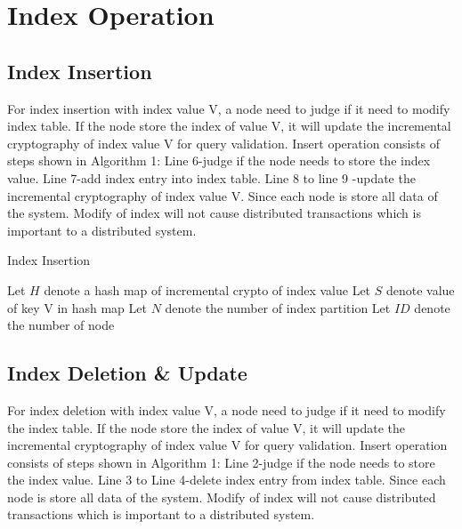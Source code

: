 
\section{Index Operation}
\subsection{Index Insertion}
\vspace{-0.2cm}
For index insertion with index value V, a node need to judge if it need to modify index table. If the node store the
index of value V, it will update the incremental cryptography of index value V for query validation. Insert operation
consists of steps shown in Algorithm 1: Line 6-judge if the node needs to store the index value. Line 7-add index entry
into index table. Line 8 to line 9 -update the incremental cryptography of index value V. Since each node is store all
data of the system. Modify of index will not cause distributed transactions which is important to a distributed system.

\LinesNumbered
\vspace{-0.5cm}
\begin{algorithm}[htb]
	\SetAlgoLined
	\caption{Index Insertion}%
	Let $H$ denote a hash map of incremental crypto of index value\;
	Let $S$ denote value of key V in hash map\;
	Let $N$ denote the number of index partition\;
	Let $ID$ denote the number of node\;
\end{algorithm}


\subsection{Index Deletion & Update}
\vspace{-0.2cm}
For index deletion with index value V, a node need to judge if it need to modify the index table. If the node store
the index of value V, it will update the incremental cryptography of index value V for query validation. Insert operation
consists of steps shown in Algorithm 1: Line 2-judge if the node needs to store the index value. Line 3 to Line 4-delete
index entry from index table. Since each node is store all data of the system. Modify of index will not cause distributed transactions which is important to a distributed system.


